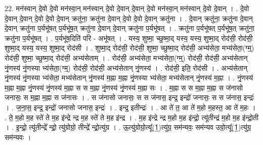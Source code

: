 \documentclass[17pt]{extarticle}
\begin{document}
22. मन॑स्वान् दे॒वो दे॒वो मन॑स्वा॒न् मन॑स्वान् दे॒वो दे॒वान् दे॒वान् दे॒वो मन॑स्वा॒न् मन॑स्वान् दे॒वो दे॒वान् । . दे॒वो दे॒वान् दे॒वान् दे॒वो दे॒वो दे॒वान् क्रतु॑ना॒ क्रतु॑ना दे॒वान् दे॒वो दे॒वो दे॒वान् क्रतु॑ना । . दे॒वान् क्रतु॑ना॒ क्रतु॑ना दे॒वान् दे॒वान् क्रतु॑ना प॒र्यभू॑षत् प॒र्यभू॑ष॒त् क्रतु॑ना दे॒वान् दे॒वान् क्रतु॑ना प॒र्यभू॑षत् । . क्रतु॑ना प॒र्यभू॑षत् प॒र्यभू॑ष॒त् क्रतु॑ना॒ क्रतु॑ना प॒र्यभू॑षत् । . प॒र्यभू॑ष॒दिति॑ परि - अभू॑षत् । . यस्य॒ शुष्मा॒ च्छुष्मा॒द् यस्य॒ यस्य॒ शुष्मा॒द् रोद॑सी॒ रोद॑सी॒ शुष्मा॒द् यस्य॒ यस्य॒ शुष्मा॒द् रोद॑सी । . शुष्मा॒द् रोद॑सी॒ रोद॑सी॒ शुष्मा॒ च्छुष्मा॒द् रोद॑सी॒ अभ्य॑सेता॒ मभ्य॑सेता॒(ग्म्॒) रोद॑सी॒ शुष्मा॒ च्छुष्मा॒द् 
रोद॑सी॒ अभ्य॑सेताम् । . रोद॑सी॒ अभ्य॑सेता॒ मभ्य॑सेता॒(ग्म्॒) रोद॑सी॒ रोद॑सी॒ अभ्य॑सेतान् नृं॒णस्य॑ नृं॒णस्या भ्य॑सेता॒(ग्म्॒) 
रोद॑सी॒ रोद॑सी॒ अभ्य॑सेतान् नृं॒णस्य॑ । . रोद॑सी॒ इति॒ रोद॑सी । . अभ्य॑सेतान् नृं॒णस्य॑ नृं॒णस्या भ्य॑सेता॒ मभ्य॑सेतान् नृं॒णस्य॑ म॒ह्ना म॒ह्ना नृं॒णस्या भ्य॑सेता॒ मभ्य॑सेतान् नृं॒णस्य॑ म॒ह्ना । . नृं॒णस्य॑ म॒ह्ना म॒ह्ना नृं॒णस्य॑ नृं॒णस्य॑ म॒ह्ना स स म॒ह्ना नृं॒णस्य॑ नृं॒णस्य॑ म॒ह्ना सः । . म॒ह्ना स स म॒ह्ना म॒ह्ना स ज॑नासो जनासः॒ स म॒ह्ना म॒ह्ना स ज॑नासः । . स ज॑नासो जनासः॒ स स ज॑नास॒ इन्द्र॒ इन्द्रो॑ जनासः॒ स स ज॑नास॒ इन्द्रः॑ । . ज॒ना॒स॒ इन्द्र॒ इन्द्रो॑ जनासो जनास॒ इन्द्रः॑ । . इन्द्र॒ इतीन्द्रः॑ । . आ ते॑ त॒ आ ते॑ म॒हो म॒हस्त॒ आ ते॑ म॒हः । . ते॒ म॒हो म॒ह स्ते॑ ते म॒ह इ॑न्द्रे न्द्र म॒ह स्ते॑ ते म॒ह इ॑न्द्र । . म॒ह इ॑न्द्रे न्द्र म॒हो म॒ह इ॑न्द्रो॒ त्यू॑तीन्द्र॑ म॒हो म॒ह इ॑न्द्रो॒ती । . इ॒न्द्रो॒ त्यू॑तीन्द्रे᳚ न्द्रो॒ त्यु॑ग्रोग्रो॒ तीन्द्रे᳚ न्द्रो॒त्यु॑ग्र । . ऊ॒त्यु॑ग्रोग्रो॒त्यू᳚(1॒)त्यु॑ग्र॒ सम॑न्यवः॒ सम॑न्यव उग्रो॒त्यू᳚(1॒)त्यु॑ग्र॒ सम॑न्यवः । \newline
\end{document}

